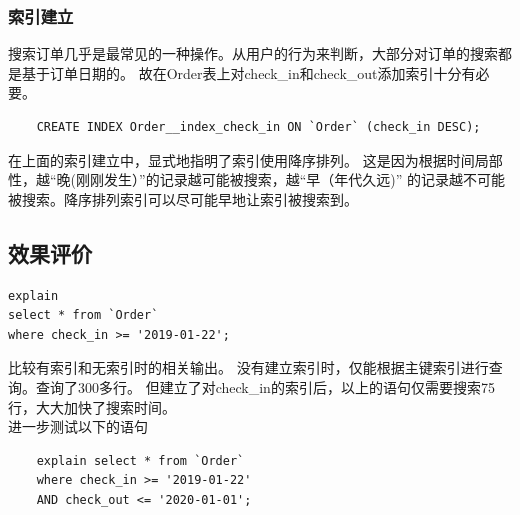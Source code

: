 \documentclass{myreport}
\begin{document}
\subsubsection{索引建立}
搜索订单几乎是最常见的一种操作。从用户的行为来判断，大部分对订单的搜索都是基于订单日期的。
故在Order表上对check\_in和check\_out添加索引十分有必要。\\

\begin{verbatim}
    CREATE INDEX Order__index_check_in ON `Order` (check_in DESC);    
\end{verbatim}


在上面的索引建立中，显式地指明了索引使用降序排列。
这是因为根据时间局部性，越``晚(刚刚发生）''的记录越可能被搜索，越``早（年代久远)''
的记录越不可能被搜索。降序排列索引可以尽可能早地让索引被搜索到。\\

\subsection{效果评价}

\begin{verbatim}
explain 
select * from `Order`
where check_in >= '2019-01-22';
\end{verbatim}


比较有索引和无索引时的相关输出。
没有建立索引时，仅能根据主键索引进行查询。查询了300多行。
但建立了对check\_in的索引后，以上的语句仅需要搜索75行，大大加快了搜索时间。\\

进一步测试以下的语句\\

\begin{verbatim}
    explain select * from `Order`
    where check_in >= '2019-01-22'
    AND check_out <= '2020-01-01';
\end{verbatim}
\end{document}
